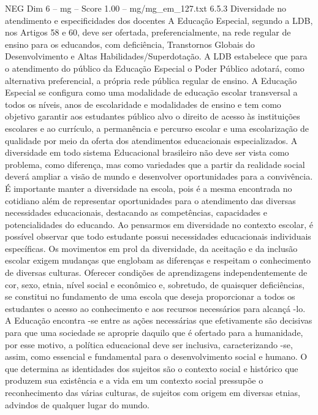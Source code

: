 \begin{textsample}{NEG Dim 6 – mg – Score 1.00 – mg/mg\_em\_127.txt}  \label{ex:f6_neg_047}
6.5.3 Diversidade no atendimento e especificidades dos docentes A Educação Especial, segundo a LDB, nos Artigos 58 e 60, deve ser ofertada, preferencialmente, na rede regular de ensino para os educandos, com deficiência, Transtornos Globais do Desenvolvimento e Altas Habilidades/Superdotação.
A LDB estabelece que para o atendimento do público da Educação Especial o Poder Público adotará, como alternativa preferencial, a própria rede pública regular de ensino.
A Educação Especial se configura como uma modalidade de educação escolar transversal a todos os níveis, anos de escolaridade e modalidades de ensino e tem como objetivo garantir aos estudantes público alvo o direito de acesso às instituições escolares e ao currículo, a permanência e percurso escolar e uma escolarização de qualidade por meio da oferta dos atendimentos educacionais especializados.
A diversidade em todo sistema Educacional brasileiro não deve ser vista como problema, como diferença, mas como variedades que a partir da realidade social deverá ampliar a visão de mundo e desenvolver oportunidades para a convivência.
É importante manter a diversidade na escola, pois é a mesma encontrada no cotidiano além de representar oportunidades para o atendimento das diversas necessidades educacionais, destacando as competências, capacidades e potencialidades do educando.
Ao pensarmos em diversidade no contexto escolar, é possível observar que todo estudante possui necessidades educacionais individuais específicas.
Os movimentos em prol da diversidade, da aceitação e da inclusão escolar exigem mudanças que englobam as diferenças e respeitam o conhecimento de diversas culturas.
Oferecer condições de aprendizagens independentemente de cor, sexo, etnia, nível social e econômico e, sobretudo, de quaisquer deficiências, se constitui no fundamento de uma escola que deseja proporcionar a todos os estudantes o acesso ao conhecimento e aos recursos necessários para alcançá -lo.
A Educação encontra -se entre as ações necessárias que efetivamente são decisivas para que uma sociedade se aproprie daquilo que é ofertado para a humanidade, por esse motivo, a política educacional deve ser inclusiva, caracterizando -se, assim, como essencial e fundamental para o desenvolvimento social e humano.
O que determina as identidades dos sujeitos são o contexto social e histórico que produzem sua existência e a vida em um contexto social pressupõe o reconhecimento das várias culturas, de sujeitos com origem em diversas etnias, advindos de qualquer lugar do mundo.

\end{textsample}
